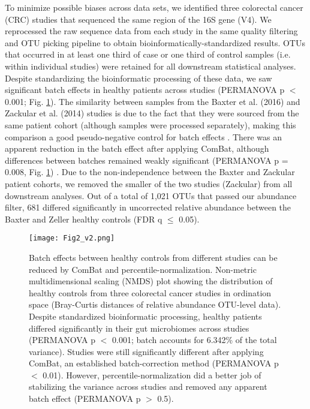 To minimize possible biases across data sets, we identified three colorectal cancer (CRC) studies that sequenced the same region of the 16S gene (V4).
We reprocessed the raw sequence data from each study in the same quality filtering and OTU picking pipeline to obtain bioinformatically-standardized results.
OTUs that occurred in at least one third of case or one third of control samples (i.e. within individual studies) were retained for all downstream statistical analyses.
Despite standardizing the bioinformatic processing of these data, we saw significant batch effects in healthy patients across studies (PERMANOVA p $<$ 0.001; Fig. \ref{percnorm:fig2}).
The similarity between samples from the Baxter et al. (2016) and Zackular et al. (2014) studies is due to the fact that they were sourced from the same patient cohort (although samples were processed separately), making this comparison a good pseudo-negative control for batch effects \cite{18,20}.
There was an apparent reduction in the batch effect after applying ComBat, although differences between batches remained weakly significant (PERMANOVA p = 0.008, Fig. \ref{percnorm:fig2}) \cite{8}.
Due to the non-independence between the Baxter and Zackular patient cohorts, we removed the smaller of the two studies (Zackular) from all downstream analyses.
Out of a total of 1,021 OTUs that passed our abundance filter, 681 differed significantly in uncorrected relative abundance between the Baxter and Zeller healthy controls (FDR q $\leq$ 0.05).

\begin{figure}[h]
\begin{center}
    \texttt{[image: Fig2\_v2.png]}
    \caption{Batch effects between healthy controls from different studies can be reduced by ComBat and percentile-normalization. Non-metric multidimensional scaling (NMDS) plot showing the distribution of healthy controls from three colorectal cancer studies in ordination space (Bray-Curtis distances of relative abundance OTU-level data). Despite standardized bioinformatic processing, healthy patients differed significantly in their gut microbiomes across studies (PERMANOVA p $<$ 0.001; batch accounts for 6.342\% of the total variance). Studies were still significantly different after applying ComBat, an established batch-correction method (PERMANOVA p $<$ 0.01). However, percentile-normalization did a better job of stabilizing the variance across studies and removed any apparent batch effect (PERMANOVA p $>$ 0.5).}\label{percnorm:fig2}
\end{center}
\end{figure}

